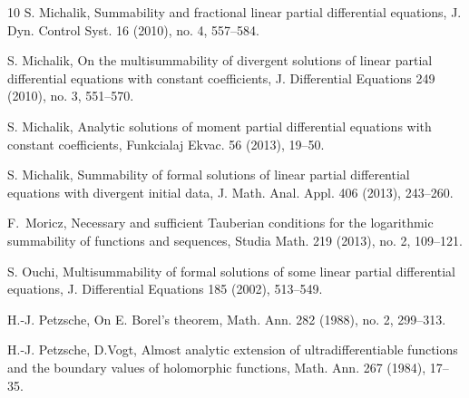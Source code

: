 \documentclass[11pt,a4paper]{article}
\theoremstyle{definition}
\begin{document}
\begin{thebibliography}{10}
 S. Michalik, Summability and fractional linear partial differential
equations, J. Dyn. Control Syst. 16 (2010), no. 4, 557--584.

 S. Michalik, On the multisummability of divergent solutions of linear partial differential
equations with constant coefficients, J. Differential Equations 249 (2010), no. 3, 551--570.

 S. Michalik, Analytic solutions of moment partial differential equations with constant
coefficients, Funkcialaj Ekvac. 56 (2013), 19--50.

 S. Michalik, Summability of formal solutions of linear partial dif\-ferential
equa\-tions with diver\-gent initial data, J. Math. Anal. Appl. 406 (2013), 243--260.

 F.~Moricz, Necessary and sufficient Tauberian conditions for the logarithmic summability
of functions and sequences, Studia Math. 219 (2013), no. 2, 109--121.




 S. Ouchi, Multisummability of formal solutions of some linear partial differential
equations, J. Differential Equations 185 (2002), 513--549.


 H.-J. Petzsche, On E. Borel's theorem, Math. Ann. 282 (1988), no. 2, 299--313.

  H.-J. Petzsche, D.Vogt, Almost analytic extension of ultradifferentiable
functions and the boundary values of holomorphic functions, Math. Ann.  267 (1984), 17--35.




\end{thebibliography}
\end{document}
